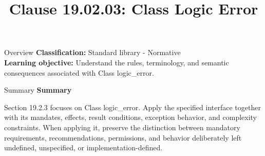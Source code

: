\documentclass[10pt,letterpaper]{article}
\title{Clause 19.02.03: Class Logic Error}
\author{}
\date{}
\begin{document}
\maketitle
\begin{CornellOverviewBox}{Overview}
\textbf{Classification:} Standard library - Normative\\[2pt]
\textbf{Learning objective:} Understand the rules, terminology, and semantic consequences associated with Class logic\_error.
\end{CornellOverviewBox}\begin{CornellSummaryBox}{Summary}
{\sffamily\bfseries\color{Accent} Summary}\par\vspace{3pt}Section 19.2.3 focuses on Class logic\_error. Apply the specified interface together with its mandates, effects, result conditions, exception behavior, and complexity constraints. When applying it, preserve the distinction between mandatory requirements, recommendations, permissions, and behavior deliberately left undefined, unspecified, or implementation-defined.
\end{CornellSummaryBox}
\end{document}
